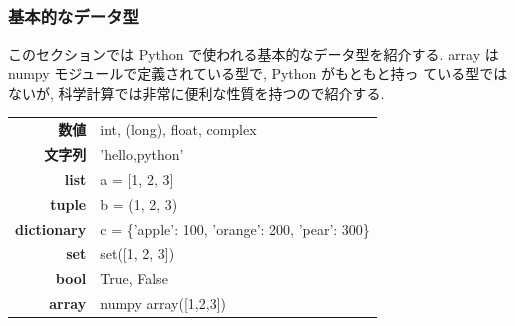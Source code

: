 \subsection*{\redm\whiteb\greenb}

\begin{frame}[t, fragile]
\frametitle{基本的なデータ型}

\alert{このセクションでは Python で使われる基本的なデータ型を紹介する. } array は numpy モジュールで定義されている型で, Python がもともと持っ
ている型ではないが, 科学計算では非常に便利な性質を持つので紹介する. 

\begin{table}[hb]
 \begin{tabular}{r|l} 
  \textbf{数値}       & int, (long), float, complex \\
  \textbf{文字列}     & 'hello,python' \\
  \textbf{list}       & a = [1, 2, 3] \\
  \textbf{tuple}      & b = (1, 2, 3) \\
  \textbf{dictionary} & c = \{'apple': 100, 'orange': 200, 'pear': 300\} \\
  \textbf{set}        & set([1, 2, 3]) \\
  \textbf{bool}       & True, False \\
  \textbf{array}      & numpy array([1,2,3]) \\
 \end{tabular}
\end{table}

\end{frame}

